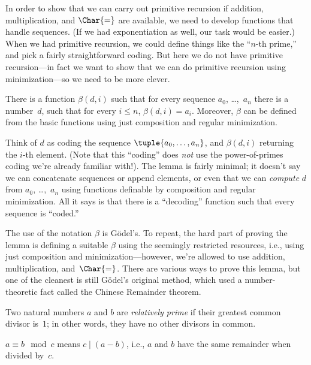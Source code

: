 \documentclass[../../../include/open-logic-section]{subfiles}
\begin{document}


In order to show that we can carry out primitive recursion if
addition, multiplication, and $\Char{=}$ are available, we need to
develop functions that handle sequences. (If we had exponentiation as
well, our task would be easier.) When we had primitive recursion, we
could define things like the ``$n$-th prime,'' and pick a fairly
straightforward coding. But here we do not have primitive
recursion---in fact we want to show that we can do primitive recursion
using minimization---so we need to be more clever.  

\begin{lem}
There is a function $\beta(d,i)$ such that for every sequence $a_0$,
\dots,~$a_n$ there is a number~$d$, such that for every $i \le n$,
$\beta(d,i) = a_i$. Moreover, $\beta$ can be defined from the basic
functions using just composition and regular minimization.
\end{lem}

Think of $d$ as coding the sequence $\tuple{a_0, \dots, a_n}$, and
$\beta(d,i)$ returning the $i$-th element. (Note that this ``coding''
does \emph{not} use the power-of-primes coding we're already familiar
with!). The lemma is fairly minimal; it doesn't say we can concatenate
sequences or append elements, or even that we can \emph{compute} $d$
from $a_0$, \dots,~$a_n$ using functions definable by composition and
regular minimization. All it says is that there is a ``decoding''
function such that every sequence is ``coded.''

The use of the notation $\beta$ is G\"odel's. To repeat, the hard part
of proving the lemma is defining a suitable $\beta$ using the
seemingly restricted resources, i.e., using just composition and
minimization---however, we're allowed to use addition, multiplication,
and~$\Char{=}$. There are various ways to prove this lemma, but one of
the cleanest is still G\"odel's original method, which used a
number-theoretic fact called the Chinese Remainder theorem.

\begin{defn}
Two natural numbers $a$ and $b$ are \emph{relatively prime} if their
greatest common divisor is~$1$; in other words, they have no other
divisors in common.
\end{defn}

\begin{defn}
$a \equiv b \mod c$ means $c \mid (a-b)$, i.e., $a$ and $b$ have the
same remainder when divided by~$c$.
\end{defn}
\end{document}
